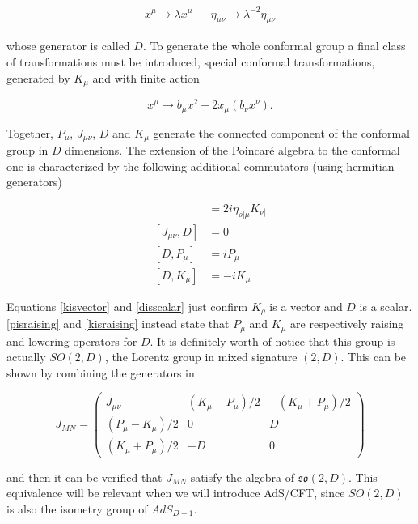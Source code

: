 \begin{align}
	x^\mu \rightarrow \lambda x^\mu && \eta_{\mu\nu} \rightarrow \lambda^{-2} \eta_{\mu\nu}
	\label{}
\end{align}

whose generator is called $D$. To generate the whole conformal group a final class of transformations must be introduced, special conformal transformations, generated by $K_\mu$ and with finite action

\begin{equation}
	x^\mu \rightarrow b_\mu x^2 - 2x_\mu (b_\nu x^\nu).
	\label{}
\end{equation}

Together, $P_\mu$, $J_{\mu\nu}$, $D$ and $K_\mu$ generate the connected component of the conformal group in $D$ dimensions. The extension of the Poincar\'e algebra to the conformal one is characterized by the following additional commutators (using hermitian generators)

\begin{align}
	[J_{\mu\nu},K_\rho] 	&= 2i \eta_{\rho[\mu} K_{\nu]}	\label{kisvector}\\
	[J_{\mu\nu},D] 		&= 0 				\label{disscalar}\\
	[D, P_\mu] 		&= i P_\mu 			\label{pisraising}\\
	[D, K_\mu] 		&= -i K_\mu			\label{kisraising}
\end{align}

Equations \eqref{kisvector} and \eqref{disscalar} just confirm $K_\rho$ is a vector and $D$ is a scalar. \eqref{pisraising} and \eqref{kisraising} instead state that $P_\mu$ and $K_\mu$ are respectively raising and lowering operators for $D$. It is definitely worth of notice that this group is actually $SO(2,D)$, the Lorentz group in mixed signature $(2,D)$. This can be shown by combining the generators in

\begin{equation}
	J_{MN} = 
	\begin{pmatrix}
		J_{\mu\nu} 		& (K_\mu - P_\mu)/2	& - (K_\mu+P_\mu)/2 \\
		(P_\mu - K_\mu)/2	& 0			& D \\
		(K_\mu+P_\mu)/2		& -D			& 0
	\end{pmatrix}
	\label{}
\end{equation}

and then it can be verified that $J_{MN}$ satisfy the algebra of $\mathfrak{so}(2,D)$. This equivalence will be relevant when we will introduce AdS/CFT, since $SO(2,D)$ is also the isometry group of $AdS_{D+1}$.

